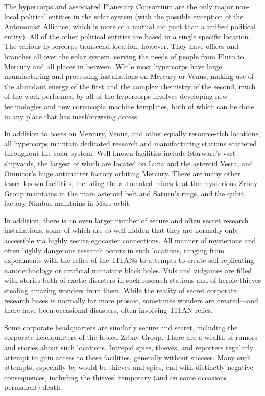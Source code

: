The hypercorps and associated Planetary Consortium 
are the only major non-local political entities in the 
solar system (with the possible exception of the Autonomist Alliance, which is more of a mutual aid pact 
than a unified political entity). All of the other political entities are based in a single specific location. The 
various hypercorps transcend location, however. They 
have offices and branches all over the solar system, 
serving the needs of people from Pluto to Mercury 
and all places in between. While most hypercorps 
have large manufacturing and processing installations 
on Mercury or Venus, making use of the abundant 
energy of the first and the complex chemistry of the 
second, much of the work performed by all of the 
hypercorps involves developing new technologies and 
new cornucopia machine templates, both of which can 
be done in any place that has meshbrowsing access.

In addition to bases on Mercury, Venus, and other 
equally resource-rich locations, all hypercorps maintain dedicated research and manufacturing stations 
scattered throughout the solar system. Well-known 
facilities include Starware's vast shipyards, the largest 
of which are located on Luna and the asteroid Vesta, 
and Omnicor's huge antimatter factory orbiting Mercury. There are many other lesser-known facilities, 
including the automated mines that the mysterious 
Zrbny Group maintains in the main asteroid belt and 
Saturn's rings, and the qubit factory Nimbus maintains in Mars orbit.

In addition, there is an even larger number of 
secure and often secret research installations, some 
of which are so well hidden that they are normally 
only accessible via highly secure egocaster connections. All manner of mysterious and often highly 
dangerous research occurs in such locations, ranging 
from experiments with the relics of the TITANs to 
attempts to create self-replicating nanotechnology or 
artificial miniature black holes. Vids and vidgames 
are filled with stories both of exotic disasters in 
such research stations and of heroic thieves stealing amazing wonders from them. While the reality 
of secret corporate research bases is normally far 
more prosaic, sometimes wonders are created—and 
there have been occasional disasters, often involving 
TITAN relics.

Some corporate headquarters are similarly secure 
and secret, including the corporate headquarters 
of the fabled Zrbny Group. There are a wealth of 
rumors and stories about such locations. Intrepid 
spies, thieves, and reporters regularly attempt to gain 
access to these facilities, generally without success. 
Many such attempts, especially by would-be thieves 
and spies, end with distinctly negative consequences, 
including the thieves' temporary (and on some occasions permanent) death.

